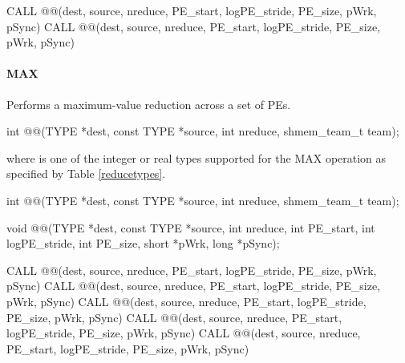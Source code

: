 \begin{apidefinition}
\begin{Fsynopsis}
CALL @@(dest, source, nreduce, PE_start, logPE_stride, PE_size, pWrk, pSync)
CALL @@(dest, source, nreduce, PE_start, logPE_stride, PE_size, pWrk, pSync)
\end{Fsynopsis}

\paragraph{MAX}
Performs a maximum-value reduction across a set of \acp{PE}.\newline

{\color{Green}
\begin{C11synopsis}
int @@(TYPE *dest, const TYPE *source, int nreduce, shmem_team_t team);
\end{C11synopsis}
where \TYPE{} is one of the integer or real types supported for the MAX operation as specified by Table \ref{reducetypes}.
}

\begin{Csynopsis}
\end{Csynopsis}
{\color{Green}
\begin{CsynopsisCol}
int @@(TYPE *dest, const TYPE *source, int nreduce, shmem_team_t team);
\end{CsynopsisCol}
}
\begin{DeprecateBlock}
\begin{CsynopsisCol}
void @@(TYPE *dest, const TYPE *source, int nreduce, int PE_start, int logPE_stride, int PE_size, short *pWrk, long *pSync);
\end{CsynopsisCol}
\end{DeprecateBlock}

\begin{Fsynopsis}
CALL @@(dest, source, nreduce, PE_start, logPE_stride, PE_size, pWrk, pSync)
CALL @@(dest, source, nreduce, PE_start, logPE_stride, PE_size, pWrk, pSync)
CALL @@(dest, source, nreduce, PE_start, logPE_stride, PE_size, pWrk, pSync)
CALL @@(dest, source, nreduce, PE_start, logPE_stride, PE_size, pWrk, pSync)
CALL @@(dest, source, nreduce, PE_start, logPE_stride, PE_size, pWrk, pSync)
\end{Fsynopsis}


\end{apidefinition}
